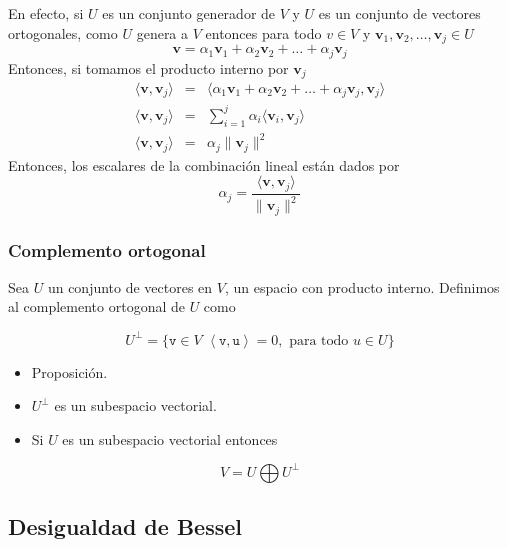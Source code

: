 \documentclass[
]{article}
\begin{document}
En efecto, si \(U\) es un conjunto generador de \(V\) y \(U\) es un
conjunto de vectores ortogonales, como \(U\) genera a \(V\) entonces
para todo \(v\in V\) y
\(\mathbf{v}_1,\mathbf{v}_2,\ldots,\mathbf{v}_j \in U\) \[
\mathbf{v}=\alpha_1 \mathbf{v}_1 + \alpha_2 \mathbf{v}_2 + \ldots + \alpha_j \mathbf{v}_j
\] Entonces, si tomamos el producto interno por \(\mathbf{v}_j\) \[
\begin{matrix}
\langle \mathbf{v}, \mathbf{v}_j \rangle  & = & 
  \langle \alpha_1 \mathbf{v}_1 + \alpha_2 \mathbf{v}_2 + \ldots + \alpha_j \mathbf{v}_j, \mathbf{v}_j \rangle \\
\langle \mathbf{v}, \mathbf{v}_j \rangle  & = & \sum_{i=1}^{j}\alpha_i \langle \mathbf{v}_i ,\mathbf{v}_j\rangle  \\
\langle \mathbf{v}, \mathbf{v}_j \rangle  & = & \alpha_j \|\mathbf{v}_j\|^2
\end{matrix}
\] Entonces, los escalares de la combinación lineal están dados por \[
\alpha_j = \frac{\langle \mathbf{v},\mathbf{v}_j  \rangle}{\|\mathbf{v}_j\|^2}
\]

\hypertarget{complemento-ortogonal}{%
\subsubsection{Complemento ortogonal}\label{complemento-ortogonal}}

Sea \(U\) un conjunto de vectores en \(V\), un espacio con producto
interno. Definimos al complemento ortogonal de \(U\) como

\begin{equation}
U^{\perp} =\big\{ \mathtt{v}\in V\,\, \left\langle \mathtt{v}, \mathtt{u}\right\rangle=0,\mbox{ para todo }u\in U\big\}
\end{equation}

\begin{itemize}
\item
  Proposición.
\item
  \(U^{\perp}\) es un subespacio vectorial.
\item
  Si \(U\) es un subespacio vectorial entonces
\end{itemize}

\[
V = U \bigoplus U^{\perp}
\]

\hypertarget{desigualdad-de-bessel}{%
\subsection{Desigualdad de Bessel}\label{desigualdad-de-bessel}}
\end{document}
